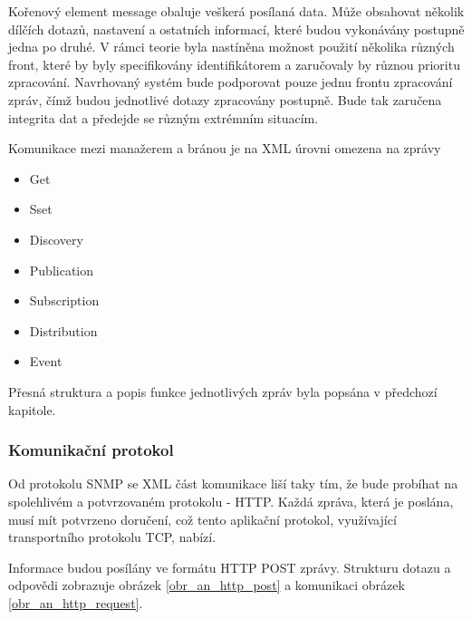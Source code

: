 Kořenový element message obaluje veškerá posílaná data. Může obsahovat několik dílčích dotazů, nastavení a ostatních informací, které budou vykonávány postupně
jedna po druhé. V rámci teorie byla nastíněna možnost použití několika různých front, které by byly specifikovány identifikátorem a zaručovaly by různou
prioritu zpracování. Navrhovaný systém bude podporovat pouze jednu frontu zpracování zpráv, čímž budou jednotlivé dotazy zpracovány postupně. Bude tak zaručena
integrita dat a předejde se různým extrémním situacím.

Komunikace mezi manažerem a bránou je na XML úrovni omezena na zprávy
\begin{itemize}
	\item Get
	\item Sset
	\item Discovery
	\item Publication
	\item Subscription
	\item Distribution
	\item Event
\end{itemize}

Přesná struktura a popis funkce jednotlivých zpráv byla popsána v předchozí kapitole.


\subsubsection*{Komunikační protokol}
Od protokolu SNMP se XML část komunikace liší taky tím, že bude probíhat na spolehlivém a potvrzovaném protokolu - HTTP. Každá zpráva, která
je poslána, musí mít potvrzeno doručení, což tento aplikační protokol, využívající transportního protokolu TCP, nabízí. 

Informace budou posílány ve formátu HTTP POST zprávy. Strukturu dotazu a odpovědi zobrazuje obrázek \ref{obr_an_http_post} a komunikaci obrázek \ref{obr_an_http_request}.

